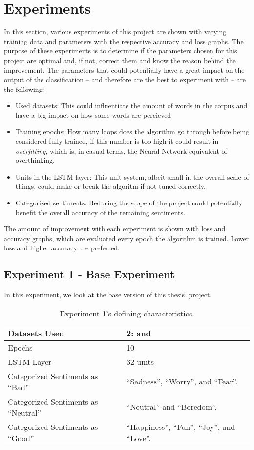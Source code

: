 \section{Experiments}
In this section, various experiments of this project are shown with varying training data and parameters with the respective accuracy and loss graphs.
The purpose of these experiments is to determine if the parameters chosen for this project are optimal and, if not, correct them and know the reason behind the improvement.
The parameters that could potentially have a great impact on the output of the classification -- and therefore are the best to experiment with -- are the following:
\begin{itemize}
	\item Used datasets: This could influentiate the amount of words in the corpus and have a big impact on how some words are percieved
	\item Training epochs: How many loops does the algorithm go through before being considered fully trained, if this number is too high it could result in \textit{overfitting}, which is, in casual terms, the Neural Network equivalent of overthinking.
	\item Units in the LSTM layer: This unit system, albeit small in the overall scale of things, could make-or-break the algoritm if not tuned correctly.
	\item Categorized sentiments: Reducing the scope of the project could potentially benefit the overall accuracy of the remaining sentiments.
\end{itemize}
The amount of improvement with each experiment is shown with loss and accuracy graphs, which are evaluated every epoch the algorithm is trained. Lower loss and higher accuracy are preferred.
\subsection{Experiment 1 - Base Experiment}
\label{exp1}
In this experiment, we look at the base version of this thesis' project.
\begin{table}[!th]
	\caption{Experiment 1's defining characteristics.}
	\vspace{0.5cm}
	\centering
	\begin{tabular}[t]{|l|l|}
	\hline
		Datasets Used & 2: \citet{d1} and \citet{d2}
	\\ \hline
		Epochs & 10
	\\ \hline
		LSTM Layer & 32 units
	\\ \hline
		Categorized Sentiments as ``Bad'' & ``Sadness'', ``Worry'', and ``Fear''.
	\\ \hline	
		 Categorized Sentiments as ``Neutral'' & ``Neutral'' and ``Boredom''.
	\\ \hline	
		Categorized Sentiments as ``Good'' & ``Happiness'', ``Fun'', ``Joy'', and ``Love''.
	\\ \hline
	\end{tabular}
\end{table}

